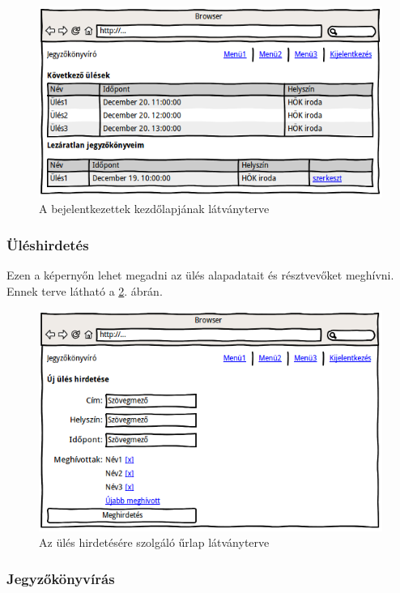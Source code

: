 \documentclass[a4paper,12pt,oneside]{report}
\begin{document}
\begin{figure}[h]
    \includegraphics[width=\textwidth]{wireframe-kezdolap}
    \caption{A bejelentkezettek kezdőlapjának látványterve}
    \label{fig:wireframe-kezdolap}
\end{figure}

\subsubsection{Üléshirdetés}

Ezen a képernyőn lehet megadni az ülés alapadatait és résztvevőket meghívni. Ennek terve látható a \ref{fig:wireframe-uleshirdetes}. ábrán.

\begin{figure}[h]
    \includegraphics[width=\textwidth]{wireframe-uleshirdetes}
    \caption{Az ülés hirdetésére szolgáló űrlap látványterve}
    \label{fig:wireframe-uleshirdetes}
\end{figure}

\subsubsection{Jegyzőkönyvírás}
\end{document}

